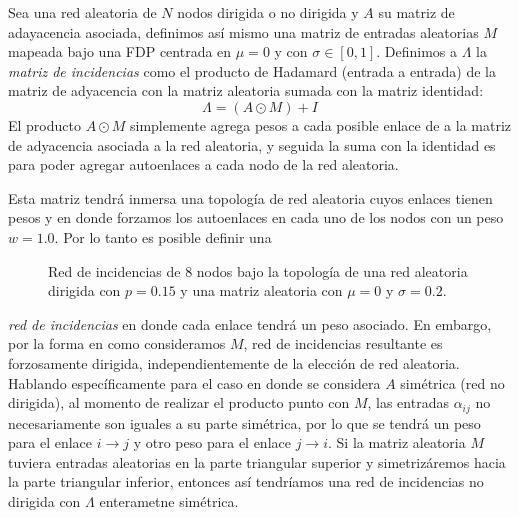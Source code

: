 \begin{definición}
	Sea una red aleatoria de $N$ nodos dirigida o no dirigida y $A$ su matriz de adayacencia asociada, definimos así mismo una matriz de entradas aleatorias $M$ mapeada bajo una FDP centrada en $\mu=0$ y con $\sigma\in[0,1]$. Definimos a $\Lambda$ la \textit{matriz de incidencias} como el producto de Hadamard (entrada a entrada) de la matriz de adyacencia con la matriz aleatoria sumada con la matriz identidad:
	$$\Lambda=(A\odot M) + I$$
	El producto $A\odot M$ simplemente agrega pesos a cada posible enlace de a la matriz de adyacencia asociada a la red aleatoria, y seguida la suma con la identidad es para poder agregar autoenlaces a cada nodo de la red aleatoria.
\end{definición}
\setlength{\parindent}{0cm}Esta matriz tendrá inmersa una topología de red aleatoria cuyos enlaces tienen pesos y en donde forzamos los autoenlaces en cada uno de los nodos con un peso $w=1.0$. Por lo tanto es posible definir una 
\begin{figure} \vspace{-30pt} \begin{center}
		 
	\end{center} 
	\vspace{-20pt} 
	\caption{Red de incidencias de 8 nodos bajo la topología de una red aleatoria dirigida con $p=0.15$ y una matriz aleatoria con $\mu=0$ y $\sigma=0.2$.} 
	\vspace{-10pt}
	\label{fig:RedIncidencias}
\end{figure} 
\textit{red de incidencias} en donde cada enlace tendrá un peso asociado. En embargo, por la forma en como consideramos $M$, red de incidencias resultante es forzosamente dirigida, independientemente de la elección de red aleatoria. Hablando específicamente para el caso en donde se considera $A$ simétrica (red no dirigida), al momento de realizar el producto punto con $M$, las entradas $\alpha_{ij}$ no necesariamente son iguales a su parte simétrica, por lo que se tendrá un peso para el enlace $i\to j$ y otro peso para el enlace $j\to i$. Si la matriz aleatoria $M$ tuviera entradas aleatorias en la parte triangular superior y simetrizáremos hacia la parte triangular inferior, entonces así tendríamos una red de incidencias no dirigida con $\Lambda$ enterametne simétrica.

